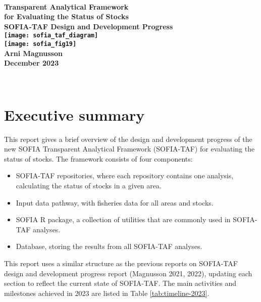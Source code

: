 \documentclass[12pt]{article}
\begin{document}
\thispagestyle{empty}

\begin{center}
  ~\\[0ex]
  \Large\bfseries Transparent Analytical Framework\\
  for Evaluating the Status of Stocks\\[1.5ex]
  \large{\rm SOFIA-TAF Design and Development Progress}\\[2.0cm]
  \texttt{[image: sofia\_taf\_diagram]}\\[1.5cm]
  \hspace{-1.5ex}\texttt{[image: sofia\_fig19]}\\[1.8cm]
  \mdseries Arni Magnusson\\[1.6ex]
  December 2023
\end{center}

\newpage

~\vspace{1em}
\setcounter{tocdepth}{2}
\tableofcontents

\newpage

\section{Executive summary}

This report gives a brief overview of the design and development progress of the
new SOFIA Transparent Analytical Framework (SOFIA-TAF) for evaluating the
status of stocks. The framework consists of four components:\\[-3ex]

\begin{itemize}
  \item SOFIA-TAF repositories, where each repository contains one analysis,
  calculating the status of stocks in a given area.\\[-3.5ex]
  \item Input data pathway, with fisheries data for all areas and
  stocks.\\[-3.5ex]
  \item SOFIA R package, a collection of utilities that are commonly used in
  SOFIA-TAF analyses.\\[-3.5ex]
  \item Database, storing the results from all SOFIA-TAF analyses.
\end{itemize}

This report uses a similar structure as the previous reports on SOFIA-TAF design
and development progress report (Magnusson 2021, 2022), updating each section to
reflect the current state of SOFIA-TAF. The main activities and milestones
achieved in 2023 are listed in Table \ref{tab:timeline-2023}.
\end{document}

